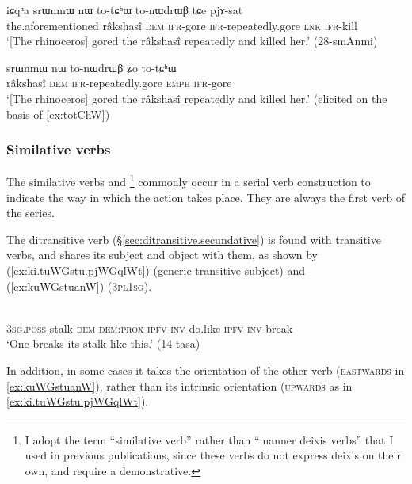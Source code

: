 \begin{exe}
\ex \label{ex:totChW}
\gll iɕqʰa srɯnmɯ nɯ to-tɕʰɯ to-nɯdrɯβ tɕe pjɤ-sat \\
the.aforementioned râkshasî \textsc{dem} \textsc{ifr}-gore \textsc{ifr}-repeatedly.gore  \textsc{lnk} \textsc{ifr}-kill \\
\glt `[The rhinoceros] gored the râkshasî repeatedly and killed her.' (28-smAnmi)
\end{exe}

\begin{exe}
\ex \label{ex:totChW2}
\gll srɯnmɯ nɯ to-nɯdrɯβ ʑo to-tɕʰɯ \\
 râkshasî \textsc{dem}  \textsc{ifr}-repeatedly.gore  \textsc{emph}  \textsc{ifr}-gore \\
 \glt `[The rhinoceros] gored the râkshasî repeatedly and killed her.' (elicited on the basis of \ref{ex:totChW})
\end{exe}	

\subsubsection{Similative verbs} \label{sec:svc.similative.verb}
The similative verbs  and \footnote{I adopt the term ``similative verb'' \citep{creissels17similative} rather than ``manner deixis verbs'' that I used in previous publications, since these verbs do not express deixis on their own, and require a demonstrative. } commonly occur in a serial verb construction to indicate the way in which the action takes place. They are always the first verb of the series. 

The ditransitive verb  (§\ref{sec:ditransitive.secundative}) is found with transitive verbs, and shares its subject and object with them, as shown by (\ref{ex:ki.tuWGstu.pjWGqlWt}) (generic transitive subject) and (\ref{ex:kuWGstuanW}) (\textsc{3pl}\fl{}\textsc{1sg}).

\begin{exe}
\ex \label{ex:ki.tuWGstu.pjWGqlWt}
 \\
\textsc{3sg}.\textsc{poss}-stalk \textsc{dem} \textsc{dem}:\textsc{prox} \textsc{ipfv}-\textsc{inv}-do.like \textsc{ipfv}-\textsc{inv}-break \\
\glt `One breaks its stalk like this.' (14-tasa)
\end{exe}	

In addition, in some cases it takes the orientation of the other verb (\textsc{eastwards} in \ref{ex:kuWGstuanW}), rather than its intrinsic orientation (\textsc{upwards} as in \ref{ex:ki.tuWGstu.pjWGqlWt}).

